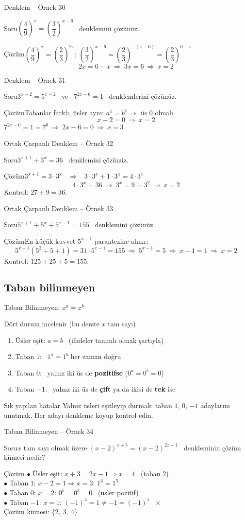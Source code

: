 \documentclass[aspectratio=169,11pt]{beamer}
\newcommand{\soru}[3]{%
\begin{frame}{#1}
  \begin{block}{Soru}\large #2\end{block}
  \pause
  \begin{exampleblock}{Çözüm}\large #3\end{exampleblock}
\end{frame}}
\begin{document}
\soru{Denklem -- Örnek 30}
{\(\left(\dfrac49\right)^{x}=\left(\dfrac32\right)^{x-6}\) \ denklemini çözünüz.}
{\(\left(\dfrac49\right)^{x}=\left(\dfrac23\right)^{2x}\); \qquad \(\left(\dfrac32\right)^{x-6}=\left(\dfrac23\right)^{-(x-6)}=\left(\dfrac23\right)^{6-x}\)
\[2x=6-x\ \Rightarrow\ 3x=6\ \Rightarrow\ x=2\]}

\soru{Denklem -- Örnek 31}
{\(3^{x-2}=5^{x-2}\) \ ve \ \(7^{2x-6}=1\) \ denklemlerini çözünüz.}
{Tabanlar farklı, üsler aynı: \(a^x=b^x\Rightarrow\) üs \(0\) olmalı.
\[x-2=0\ \Rightarrow\ x=2\]
\(7^{2x-6}=1=7^0\ \Rightarrow\ 2x-6=0\ \Rightarrow\ x=3\)}

\soru{Ortak Çarpanlı Denklem -- Örnek 32}
{\(3^{x+1}+3^{x}=36\) \ denklemini çözünüz.}
{\(3^{x+1}=3\cdot 3^x\) \ \(\Rightarrow\) \ \(3\cdot 3^x+1\cdot 3^x=4\cdot 3^x\)
\[4\cdot 3^x=36\ \Rightarrow\ 3^x=9=3^2\ \Rightarrow\ x=2\]
Kontrol: \(27+9=36\).}

\soru{Ortak Çarpanlı Denklem -- Örnek 33}
{\(5^{x+1}+5^{x}+5^{x-1}=155\) \ denklemini çözünüz.}
{En küçük kuvvet \(5^{x-1}\) parantezine alınır:
\[5^{x-1}(5^2+5+1)=31\cdot 5^{x-1}=155\ \Rightarrow\ 5^{x-1}=5\ \Rightarrow\ x-1=1\ \Rightarrow\ x=2\]
Kontrol: \(125+25+5=155\).}

\subsection{Taban bilinmeyen}
\begin{frame}{Taban Bilinmeyen: \(x^a=x^b\)}
\begin{block}{Dört durum incelenir (bu derste \(x\) tam sayı)}
\begin{enumerate}
\item Üsler eşit: \(a=b\) \ (ifadeler tanımlı olmak şartıyla)
\item Taban \(1\): \ \(1^a=1^b\) her zaman doğru
\item Taban \(0\): \ yalnız iki üs de \textbf{pozitifse} (\(0^a=0^b=0\))
\item Taban \(-1\): \ yalnız iki üs de \textbf{çift} ya da ikisi de \textbf{tek} ise
\end{enumerate}
\end{block}
\begin{alertblock}{Sık yapılan hatalar}
Yalnız üsleri eşitleyip durmak: taban \(1\), \(0\), \(-1\) adaylarını unutmak. Her adayı denkleme koyup kontrol edin.
\end{alertblock}
\end{frame}

\soru{Taban Bilinmeyen -- Örnek 34}
{\(x\) tam sayı olmak üzere \((x-2)^{x+3}=(x-2)^{2x-1}\) \ denkleminin çözüm kümesi nedir?}
{\normalsize
\(\bullet\) Üsler eşit: \(x+3=2x-1\Rightarrow x=4\) \ (taban \(2\)) \checkmark\\[2pt]
\(\bullet\) Taban \(1\): \(x-2=1\Rightarrow x=3\): \(1^6=1^5\) \checkmark\\[2pt]
\(\bullet\) Taban \(0\): \(x=2\): \(0^5=0^3=0\) \ (üsler pozitif) \checkmark\\[2pt]
\(\bullet\) Taban \(-1\): \(x=1\): \((-1)^4=1\neq -1=(-1)^1\) \ \(\times\)\\[4pt]
\large Çözüm kümesi: \(\{2,\ 3,\ 4\}\)}
\end{document}
